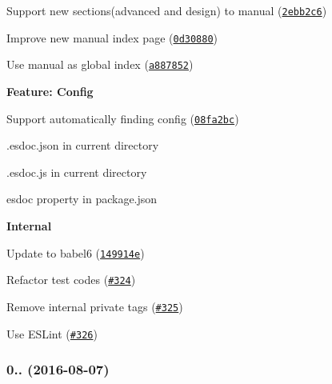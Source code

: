 \begin{DoxyItemize}
\begin{DoxyItemize}
\item Support new sections({\ttfamily advanced} and {\ttfamily design}) to manual (\href{https://github.com/esdoc/esdoc/commit/2ebb2c60e9141b4b562c0a684c21e7cfdfc94857}{\tt 2ebb2c6})
\item Improve new manual index page (\href{https://github.com/esdoc/esdoc/commit/0d30880e58264f3bc0069246df4a6a3e6058a69b}{\tt 0d30880})
\item Use manual as global index (\href{https://github.com/esdoc/esdoc/commit/a887852316c2c29ea377ed67d9415bf11dc1b630}{\tt a887852})
\end{DoxyItemize}
\item {\bfseries Feature\+: Config}
\begin{DoxyItemize}
\item Support automatically finding config (\href{https://github.com/esdoc/esdoc/commit/08fa2bc296b552168f86538561174e010a3a2f14}{\tt 08fa2bc})
\begin{DoxyItemize}
\item {\ttfamily .esdoc.\+json} in current directory
\item {\ttfamily .esdoc.\+js} in current directory
\item {\ttfamily esdoc} property in {\ttfamily package.\+json}
\end{DoxyItemize}
\end{DoxyItemize}
\item {\bfseries Internal}
\begin{DoxyItemize}
\item Update to babel6 (\href{https://github.com/esdoc/esdoc/commit/149914e84cb3bb061f2bdf2e43af00178b131a9e}{\tt 149914e})
\item Refactor test codes (\href{https://github.com/esdoc/esdoc/pull/324}{\tt \#324})
\item Remove internal private tags (\href{https://github.com/esdoc/esdoc/pull/325}{\tt \#325})
\item Use E\+S\+Lint (\href{https://github.com/esdoc/esdoc/pull/326}{\tt \#326})
\end{DoxyItemize}
\end{DoxyItemize}

\subsubsection*{0.. (2016-\/08-\/07)}


